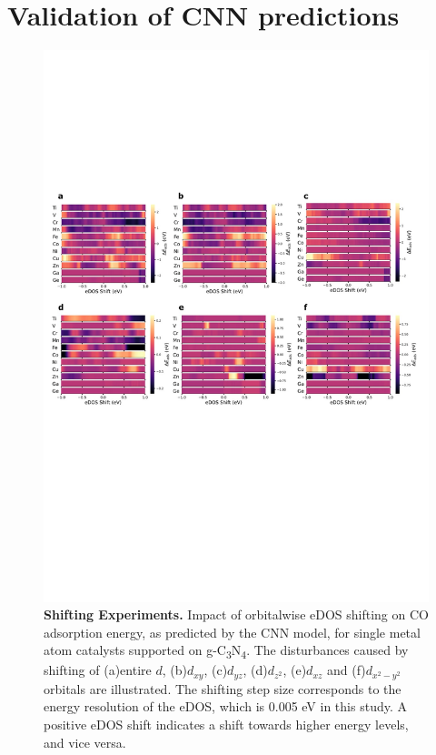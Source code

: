 

\section{Validation of CNN predictions}


\begin{figure}
    \centering
    \includegraphics[width=0.95\linewidth]{main_fig5_shifting.JPG}
    \caption{\textbf{Shifting Experiments.}
    Impact of orbitalwise eDOS shifting on CO adsorption energy, as predicted by the CNN model, for single metal atom catalysts supported on g-C\textsubscript{3}N\textsubscript{4}.
    The disturbances caused by shifting of (a)entire $d$, (b)$d_{xy}$, (c)$d_{yz}$, (d)$d_{z^2}$, (e)$d_{xz}$ and (f)$d_{x^2-y^2}$ orbitals are illustrated.
    The shifting step size corresponds to the energy resolution of the eDOS, which is 0.005 eV in this study.
    A positive eDOS shift indicates a shift towards higher energy levels, and vice versa.}
    \label{main_fig5:shifting}
\end{figure}


